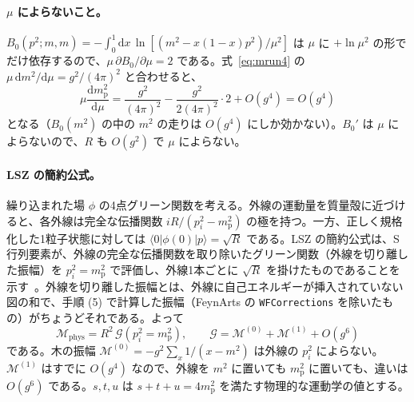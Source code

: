 \documentclass[a4paper,10pt]{ltjsarticle}
\newcommand{\dd}{\mathrm{d}}
\begin{document}
\paragraph{$\mu$ によらないこと。}$B_0(p^2;m,m)=-\int_0^1\dd x\,\ln[(m^2-x(1-x)p^2)/\mu^2]$ は $\mu$ に $+\ln\mu^2$ の形でだけ依存するので、$\mu\,\partial B_0/\partial\mu=2$ である。式~\eqref{eq:mrun4} の $\mu\,\dd m^2/\dd\mu=g^2/(4\pi)^2$ と合わせると、
\begin{equation*}
\mu\frac{\dd m_{\mathrm p}^2}{\dd\mu}=\frac{g^2}{(4\pi)^2}-\frac{g^2}{2(4\pi)^2}\cdot2+O(g^4)=O(g^4)
\end{equation*}
となる（$B_0(m^2)$ の中の $m^2$ の走りは $O(g^4)$ にしか効かない）。$B_0'$ は $\mu$ によらないので、$R$ も $O(g^2)$ で $\mu$ によらない。

\paragraph{LSZ の簡約公式。}繰り込まれた場 $\phi$ の4点グリーン関数を考える。外線の運動量を質量殻に近づけると、各外線は完全な伝播関数 $iR/(p_i^2-m_{\mathrm p}^2)$ の極を持つ。一方、正しく規格化した1粒子状態に対しては $\langle0|\phi(0)|p\rangle=\sqrt R$ である。LSZ の簡約公式は、S 行列要素が、外線の完全な伝播関数を取り除いたグリーン関数（外線を切り離した振幅）を $p_i^2=m_{\mathrm p}^2$ で評価し、外線1本ごとに $\sqrt R$ を掛けたものであることを示す~\cite{peskin}。外線を切り離した振幅とは、外線に自己エネルギーが挿入されていない図の和で、手順 (5) で計算した振幅（FeynArts の \texttt{WFCorrections} を除いたもの）がちょうどそれである。よって
\begin{equation*}
\mathcal{M}_{\mathrm{phys}}=R^2\,\mathcal{G}(p_i^2=m_{\mathrm p}^2),\qquad
\mathcal{G}=\mathcal{M}^{(0)}+\mathcal{M}^{(1)}+O(g^6)
\end{equation*}
である。木の振幅 $\mathcal{M}^{(0)}=-g^2\sum_x1/(x-m^2)$ は外線の $p_i^2$ によらない。$\mathcal{M}^{(1)}$ はすでに $O(g^4)$ なので、外線を $m^2$ に置いても $m_{\mathrm p}^2$ に置いても、違いは $O(g^6)$ である。$s,t,u$ は $s+t+u=4m_{\mathrm p}^2$ を満たす物理的な運動学の値とする。
\end{document}
